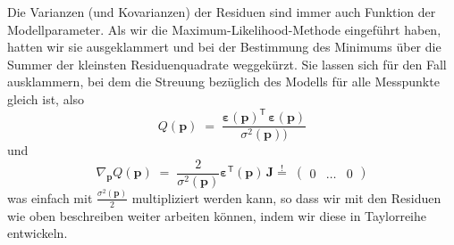 Die Varianzen (und Kovarianzen) der Residuen sind immer auch Funktion der Modellparameter. Als wir die
Maximum-Likelihood-Methode eingeführt haben, hatten wir sie ausgeklammert und bei der Bestimmung
des Minimums über die Summer der kleinsten Residuenquadrate weggekürzt. Sie
lassen sich für den Fall ausklammern, bei dem die Streuung bezüglich des Modells
für alle Messpunkte gleich ist, also
\begin{equation}
Q(\mathbf{p}) \; = \;
 \frac{\boldsymbol{\varepsilon}(\mathbf{p})^\mathsf{T} \, \boldsymbol{\varepsilon}(\mathbf{p})}{\sigma^2(\mathbf{p}))}
\end{equation}
und
\begin{equation}
\nabla_{\mathbf{p}} Q(\mathbf{p})  \; = \; 
\frac{2}{\sigma^2(\mathbf{p})} \boldsymbol{\varepsilon}^\textsf{T}(\mathbf{p})
 \, \boldsymbol{J} \overset{!}{=} \; \left(\begin{array}{ccc} 0 & \dots & 0 \end{array}\right)
\label{ZielfunktionalGradJmitSigma}
\end{equation}
was einfach mit $\frac{\sigma^2(\mathbf{p})}{2}$ multipliziert werden kann, so dass wir mit
den Residuen wie oben beschreiben weiter arbeiten können, indem wir diese in Taylorreihe entwickeln.

